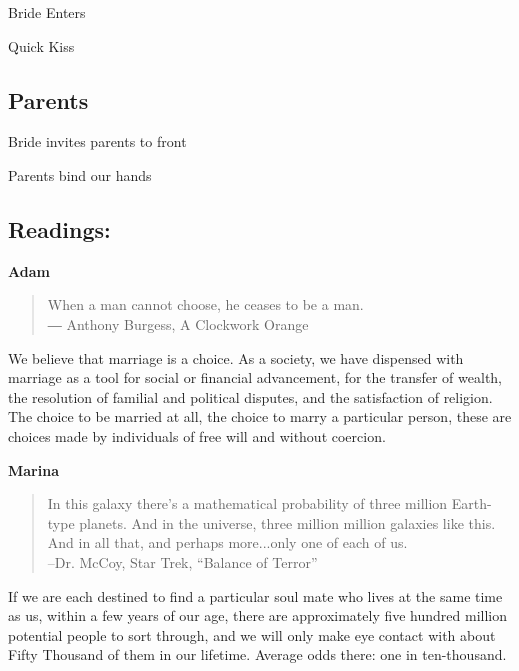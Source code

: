 \documentclass[twoside]{article}
\begin{document}
      Bride Enters
  		
      Quick Kiss
	  
    \subsection{Parents} 
     
     Bride invites parents to front
     
     Parents bind our hands

  	\subsection{Readings:}

      \begin{center}
        \textbf{Adam}
      \end{center}
      \begin{quote}
        When a man cannot choose, he ceases to be a man.
        \\
        ― Anthony Burgess, A Clockwork Orange
      \end{quote}

We believe that marriage is a choice. As a society, we have dispensed with marriage as a tool for social or financial advancement, for the transfer of wealth, the resolution of familial and political disputes, and the satisfaction of religion. The choice to be married at all, the choice to marry a particular person, these are choices made by individuals of free will and without coercion. 

      \begin{center}
        \textbf{Marina}
      \end{center}
      \begin{quote}
        In this galaxy there’s a mathematical probability of three million Earth-type planets. And in the universe, three million million galaxies like this. And in all that, and perhaps more...only one of each of us.
        \\
        --Dr. McCoy, Star Trek, “Balance of Terror”
      \end{quote}

If we are each destined to find a particular soul mate who lives at the same time as us, within a few years of our age, there are approximately five hundred million potential people to sort through, and we will only make eye contact with about Fifty Thousand of them in our lifetime. Average odds there: one in ten-thousand. 
\end{document}
